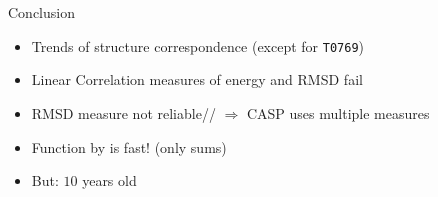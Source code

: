 \section{}



\begin{frame}{Conclusion}
    \begin{itemize}[<+->]
        \item Trends of structure correspondence (except for \texttt{T0769})
        \item Linear Correlation measures of energy and RMSD fail
        \item RMSD measure not reliable//
        $\Rightarrow$ CASP uses multiple measures
        \item Function by \cite{Zhang1997} is fast! (only sums)
        \item But: $10$ years old
    \end{itemize}
\end{frame}
